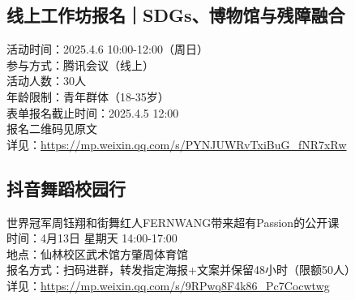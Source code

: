 \documentclass[letterpaper, 12pt]{article}
\begin{document}
\begin{multicols}{2}
\begin{tabular}{|>{\centering\arraybackslash}m{}|m{}|m{}|}
    \hline
\end{tabular}
\subsection{线上工作坊报名｜SDGs、博物馆与残障融合}
活动时间：2025.4.6  10:00-12:00（周日）
\\参与方式：腾讯会议（线上）
\\活动人数：30人
\\年龄限制：青年群体（18-35岁）
\\表单报名截止时间：2025.4.5 12:00
\\报名二维码见原文
\\详见：\url{https://mp.weixin.qq.com/s/PYNJUWRvTxiBuG_fNR7xRw}
\subsection{抖音舞蹈校园行}
世界冠军周钰翔和街舞红人FERNWANG带来超有Passion的公开课
\\时间：4月13日 星期天 14:00-17:00
\\地点：仙林校区武术馆方肇周体育馆
\\报名方式：扫码进群，转发指定海报+文案并保留48小时（限额50人）
\\详见：\url{https://mp.weixin.qq.com/s/9RPwq8F4k86_Pc7Cocwtwg}
\end{multicols}
\end{document}
